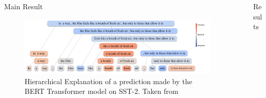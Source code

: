 \documentclass[final]{beamer}
\newlength{\sepwid}
\newlength{\onecolwid}
\newlength{\twocolwid}
\begin{document}
\begin{frame}[t]
\begin{columns}[t]
\begin{column}{\twocolwid}
\begin{alertblock}{Main Result}
    \begin{figure}
        \includegraphics[width=0.95\linewidth]{images/result.png}
        \caption{Hierarchical Explanation of a prediction made by the BERT Transformer model on SST-2. Taken from \cite{jin2020towards}}
    \end{figure}
\end{alertblock} 

\begin{columns}[t,totalwidth=\twocolwid] %
\begin{column}{\onecolwid} %



\end{column} %

\begin{column}{\onecolwid} %

\end{column} %
\end{columns} %
\end{column} %

\begin{column}{\sepwid}\end{column} %

\begin{column}{\onecolwid} %
\begin{block}{Results}


\end{block}
\end{column}
\end{columns}
\end{frame}
\end{document}
